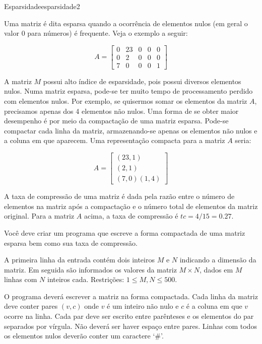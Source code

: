 \documentclass[12pt,a4paper,oneside]{article}
\begin{document}
\begin{problem}{Esparsidade}{esparsidade}{2}

Uma matriz é dita esparsa quando a ocorrência de elementos nulos (em geral o valor 0 para números) é frequente. Veja o exemplo a seguir:

$$A =
\begin{bmatrix}
0 & 23 & 0 & 0 & 0\\
0 & 2 & 0 & 0 & 0\\
7 & 0 & 0 & 0 & 1
\end{bmatrix}$$

A matriz $M$ possui alto índice de esparsidade, pois possui diversos elementos nulos. Numa matriz esparsa, pode-se ter muito tempo de processamento perdido com elementos nulos. Por exemplo, se quisermos somar os elementos da matriz $A$, precisamos apenas dos 4 elementos não nulos.
Uma forma de se obter maior desempenho é por meio da compactação de uma matriz esparsa. Pode-se compactar cada linha da matriz, armazenando-se apenas os elementos não nulos e a coluna em que aparecem. Uma representação compacta para a matriz $A$ seria:

$$A =
\begin{bmatrix}
(23,1)\\
(2,1)\\
(7,0)(1,4)
\end{bmatrix}$$

A taxa de compressão de uma matriz é dada pela razão entre o número de elementos na matriz após a compactação e o número total de elementos da matriz original. Para a matriz $A$ acima, a taxa de compressão é $tc=4/15=0.27$.

Você deve criar um programa que escreve a forma compactada de uma matriz esparsa bem como sua taxa de compressão.

%

\InputFile



A primeira linha da entrada contém dois inteiros $M$ e $N$ indicando a dimensão da matriz. Em seguida são informados os valores da matriz $M \times N$, dados em $M$ linhas com $N$ inteiros cada. Restrições: $1 \leq M, N \leq 500$.


\OutputFile

O programa deverá escrever a matriz na forma compactada. Cada linha da matriz deve conter pares $(v,c)$ onde $v$ é um inteiro não nulo e $c$ é a coluna em que $v$ ocorre na linha. Cada par deve ser escrito entre parênteses e os elementos do par separados por
vírgula. Não deverá ser haver espaço entre pares. Linhas com todos os elementos nulos deverão conter um caractere `\#'.


\end{problem}
\end{document}
